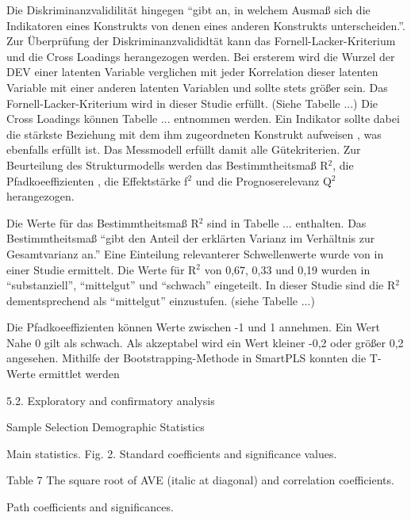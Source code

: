 Die Diskriminanzvalidilität hingegen "`gibt an, in welchem Ausmaß sich die Indikatoren eines Konstrukts von denen eines anderen Konstrukts unterscheiden."'\parencite[S.26]{nitzl2010anwenderorientierte}. Zur Überprüfung der Diskriminanzvalididtät kann das Fornell-Lacker-Kriterium und die Cross Loadings herangezogen werden. 
Bei ersterem wird die Wurzel der DEV einer latenten Variable verglichen mit jeder Korrelation dieser latenten Variable mit einer anderen latenten Variablen und sollte stets größer sein.\parencite[vgl.][S.26]{nitzl2010anwenderorientierte} Das Fornell-Lacker-Kriterium wird in dieser Studie erfüllt. (Siehe Tabelle ...) Die Cross Loadings können Tabelle ... entnommen werden. Ein Indikator sollte dabei die stärkste Beziehung mit dem ihm zugeordneten Konstrukt aufweisen \parencite[vgl.][S.26]{nitzl2010anwenderorientierte}, was ebenfalls erfüllt ist.   \nocite{fornell1981evaluating}
Das Messmodell erfüllt damit alle Gütekriterien. Zur Beurteilung des Strukturmodells werden das Bestimmtheitsmaß R$^2$, die Pfadkoeeffizienten , die Effektstärke f$^2$ und die Prognoserelevanz Q$^2$ herangezogen.  

Die Werte für das Bestimmtheitsmaß R$^2$ sind in Tabelle ... enthalten. Das Bestimmtheitsmaß "`gibt den Anteil der erklärten Varianz im Verhältnis zur Gesamtvarianz an."'\parencite[S.32]{nitzl2010anwenderorientierte} Eine Einteilung relevanterer Schwellenwerte wurde von \cite[S.323]{chin1998partial} in einer Studie ermittelt. Die Werte für R$^2$ von 0,67, 0,33 und 0,19 wurden in "`substanziell"', "`mittelgut"' und "`schwach"' eingeteilt. In dieser Studie sind die R$^2$ dementsprechend als "`mittelgut"' einzustufen. (siehe Tabelle ...)

Die Pfadkoeeffizienten können Werte zwischen -1 und 1 annehmen. Ein Wert Nahe 0 gilt als schwach. Als akzeptabel wird ein Wert kleiner -0,2 oder größer 0,2 angesehen.\parencite[vgl.][S.11]{chin1998commentary} Mithilfe der Bootstrapping-Methode in SmartPLS konnten die T-Werte ermittlet werden


5.2. Exploratory and confirmatory analysis

Sample Selection
Demographic Statistics

Main statistics.
Fig. 2. Standard coefficients and significance values.

Table 7
The square root of AVE (italic at diagonal) and correlation coefficients.

Path coefficients and significances.












